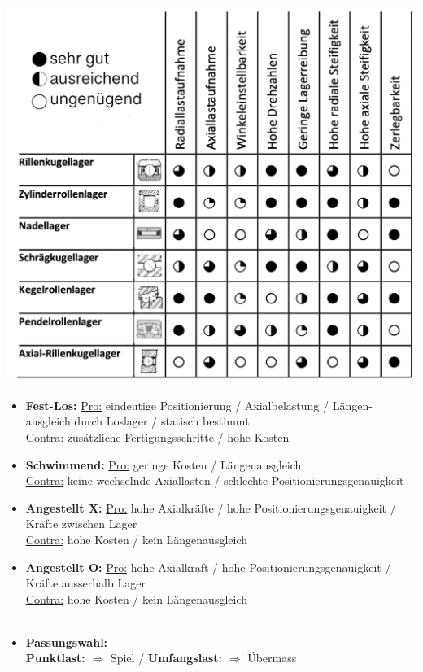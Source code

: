 \begin{center}
    \includegraphics[width = 0.9\linewidth]{src/images/MAEIP_Lagerungen}
\end{center}
\begin{scriptsize}
    \begin{itemize}
        \item \textbf{Fest-Los:} \underline{Pro:} eindeutige Positionierung / Axialbelastung / Längen-\\ausgleich durch Loslager / statisch bestimmt
        \\ \underline{Contra:} zusätzliche Fertigungsschritte / hohe Kosten
        \item \textbf{Schwimmend:} \underline{Pro:} geringe Kosten / Längenausgleich
        \\ \underline{Contra:} keine wechselnde Axiallasten / schlechte Positionierungsgenauigkeit
        \item \textbf{Angestellt X:} \underline{Pro:} hohe Axialkräfte / hohe Positionierungsgenauigkeit / Kräfte zwischen Lager 
        \\ \underline{Contra:} hohe Kosten / kein Längenausgleich
        \item \textbf{Angestellt O:} \underline{Pro:} hohe Axialkraft / hohe Positionierungsgenauigkeit / Kräfte ausserhalb Lager
        \\ \underline{Contra:} hohe Kosten / kein Längenausgleich
        \\~\\
        \item \textbf{Passungswahl:} 
        \\ \textbf{Punktlast:} $\Rightarrow$ Spiel / \textbf{Umfangslast:} $\Rightarrow$ Übermass 
    \end{itemize} 
\end{scriptsize}